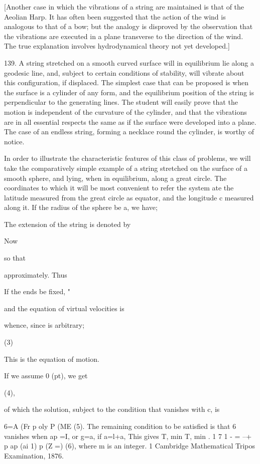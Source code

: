 [Another case in which the vibrations of a string are maintained is that of the
Aeolian Harp. It has often been suggested that the action of the wind is
analogous to that of a bow; but the analogy is disproved by the observation
that the vibrations are executed in a plane transverse to the direction of the
wind. The true explanation involves hydrodynamical theory not yet developed.]

139. A string stretched on a smooth curved surface will in equilibrium lie
along a geodesic line, and, subject to certain conditions of stability, will
vibrate about this configuration, if displaced. The simplest case that can be
proposed is when the surface is a cylinder of any form, and the equilibrium
position of the string is perpendicular to the generating lines. The student
will easily prove that the motion is independent of the curvature of the
cylinder, and that the vibrations are in all essential respects the same as if
the surface were developed into a plane. The case of an endless string, forming
a necklace round the cylinder, is worthy of notice.

In order to illustrate the characteristic features of this class of problems,
we will take the comparatively simple example of a string stretched on the
surface of a smooth sphere, and lying, when in equilibrium, along a great
circle. The coordinates to which it will be most convenient to refer the system
ate the latitude measured from the great circle as equator, and the longitude c
measured along it. If the radius of the sphere be a, we have;

The extension of the string is denoted by

Now

so that

approximately. Thus

If the ends be fixed, "

and the equation of virtual velocities is

whence, since is arbitrary;

(3)

This is the equation of motion.

If we assume 0 (pt), we get

(4),

of which the solution, subject to the condition that vanishes with c, is

6=A (Fr p oly P (ME (5). The remaining condition to be satisfied is that 6
vanishes when ap =I, or g=a, if a=l+a, This gives T, min T, min . 1 7 1 - = --+
p ap (ai 1) p (Z =) (6), where m is an integer. 1 Cambridge Mathematical Tripos
Examination, 1876.

